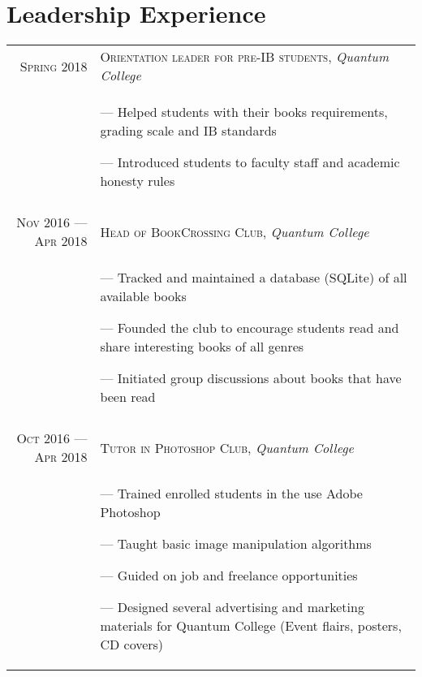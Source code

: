\documentclass[a4paper,10pt]{article}
\begin{document}
\section{Leadership Experience}
\begin{tabular}{r|p{11cm}}

  \textsc{Spring 2018} &  \textsc{Orientation leader for pre-IB students}, \emph{Quantum College}\\&\footnotesize{
  --- Helped students with their books requirements, grading scale and IB standards

  --- Introduced students to faculty staff and academic honesty rules
  } \\\multicolumn{2}{c}{}\\

  \textsc{Nov 2016 --- Apr 2018} &  \textsc{Head of BookCrossing Club}, \emph{Quantum College}\\&\footnotesize{
  --- Tracked and maintained a database (SQLite) of all available books

  --- Founded the club to encourage students read and share interesting books of all genres

  --- Initiated group discussions about books that have been read
  } \\\multicolumn{2}{c}{}\\

  \textsc{Oct 2016 --- Apr 2018} &  \textsc{Tutor in Photoshop Club}, \emph{Quantum College}\\&\footnotesize{
  --- Trained enrolled students in the use Adobe Photoshop

  --- Taught basic image manipulation algorithms

  --- Guided on job and freelance opportunities

  --- Designed several advertising and marketing materials for Quantum College (Event flairs, posters, CD covers)
  } \\%
  
\end{tabular}
\end{document}

